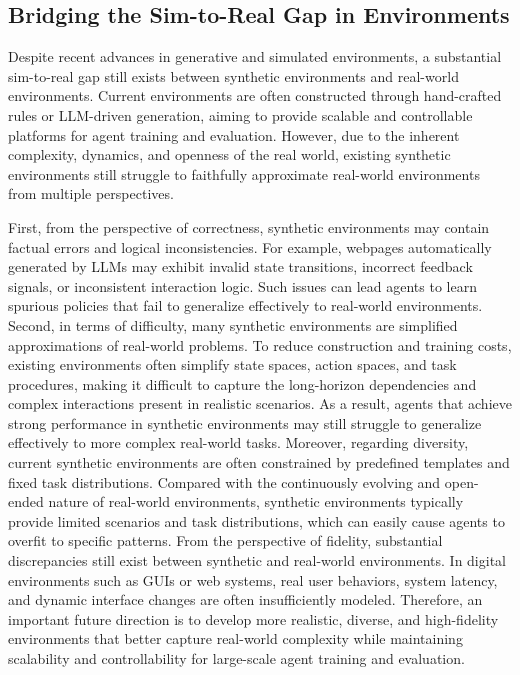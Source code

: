 \documentclass{llmxive}
\begin{document}
\subsection{Bridging the Sim-to-Real Gap in Environments}

Despite recent advances in generative and simulated environments, a substantial sim-to-real gap still exists between synthetic environments and real-world environments. 
Current environments are often constructed through hand-crafted rules or LLM-driven generation, aiming to provide scalable and controllable platforms for agent training and evaluation.
However, due to the inherent complexity, dynamics, and openness of the real world, existing synthetic environments still struggle to faithfully approximate real-world environments from multiple perspectives.

First, from the perspective of correctness, synthetic environments may contain factual errors and logical inconsistencies.
For example, webpages automatically generated by LLMs may exhibit invalid state transitions, incorrect feedback signals, or inconsistent interaction logic.
Such issues can lead agents to learn spurious policies that fail to generalize effectively to real-world environments.
Second, in terms of difficulty, many synthetic environments are simplified approximations of real-world problems.
To reduce construction and training costs, existing environments often simplify state spaces, action spaces, and task procedures, making it difficult to capture the long-horizon dependencies and complex interactions present in realistic scenarios.
As a result, agents that achieve strong performance in synthetic environments may still struggle to generalize effectively to more complex real-world tasks.
Moreover, regarding diversity, current synthetic environments are often constrained by predefined templates and fixed task distributions.
Compared with the continuously evolving and open-ended nature of real-world environments, synthetic environments typically provide limited scenarios and task distributions, which can easily cause agents to overfit to specific patterns.
From the perspective of fidelity, substantial discrepancies still exist between synthetic and real-world environments. 
In digital environments such as GUIs or web systems, real user behaviors, system latency, and dynamic interface changes are often insufficiently modeled. 
Therefore, an important future direction is to develop more realistic, diverse, and high-fidelity environments that better capture real-world complexity while maintaining scalability and controllability for large-scale agent training and evaluation.
\end{document}
